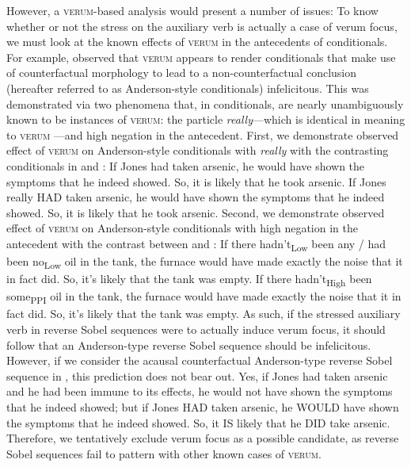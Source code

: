 However, a {\scshape verum}-based analysis would present a number of issues: To know whether or not the stress on the auxiliary verb is actually a case of verum focus, we must look at the known effects of {\scshape verum} in the antecedents of conditionals. For example, \textcite[p.~533]{Romero2015} observed that {\scshape verum} appears to render conditionals that make use of counterfactual morphology to lead to a non-counterfactual conclusion (hereafter referred to as Anderson-style conditionals) infelicitous. This was demonstrated via two phenomena that, in conditionals, are nearly unambiguously known to be instances of {\scshape verum}: the particle \textit{really}---which is identical in meaning to {\scshape verum} \parencite[p.~625]{Romero2004}---and high negation in the antecedent. First, we demonstrate  observed effect of {\scshape verum} on Anderson-style conditionals with \textit{really} with the contrasting conditionals in  and :
\pex{}
\a{} If Jones had taken arsenic, he would have shown the symptoms that he indeed showed. So, it is likely that he took arsenic.\hfill\parencite{Anderson1951}
\a{}\ljudge{\#} If Jones really \MakeUppercase{had} taken arsenic, he would have shown the symptoms that he indeed showed. So, it is likely that he took arsenic.
\xe
Second, we demonstrate  observed effect of {\scshape verum} on Anderson-style conditionals with high negation in the antecedent with the contrast between  and :
\pex{}
\a{} If there hadn’t\textsubscript{Low} been any / had been no\textsubscript{Low} oil in the tank, the furnace would have made exactly the noise that it in fact did. So, it’s likely that the tank was empty.\hfill\parencite[p.~521]{Romero2015}
\a{} \ljudge{\#} If there hadn’t\textsubscript{High} been some\textsubscript{PPI} oil in the tank, the furnace would have made exactly the noise that it in fact did. So, it’s likely that the tank was empty.\hfill\parencite[p.~521]{Romero2015}
\xe
As such, if the stressed auxiliary verb in reverse Sobel sequences were to actually induce verum focus, it should follow that an Anderson-type reverse Sobel sequence should be infelicitous. However, if we consider the acausal counterfactual Anderson-type reverse Sobel sequence in , this prediction does not bear out.
\ex{}
Yes, if Jones had taken arsenic and he had been immune to its effects, he would not have shown the symptoms that he indeed showed; but if Jones \MakeUppercase{had} taken arsenic, he \MakeUppercase{would} have shown the symptoms that he indeed showed. So, it \MakeUppercase{is} likely that he \MakeUppercase{did} take arsenic.
\xe
Therefore, we tentatively exclude verum focus as a possible candidate, as reverse Sobel sequences fail to pattern with other known cases of {\scshape verum}.%

